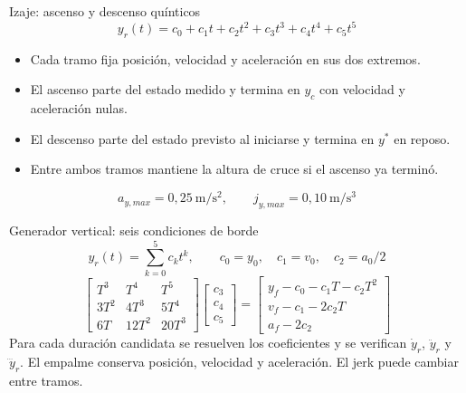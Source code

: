 \documentclass[aspectratio=169,11pt]{beamer}
\begin{document}
\begin{frame}[t,label=trayectoria3]{Izaje: ascenso y descenso quínticos}
\[ y_r(t)=c_0+c_1t+c_2t^2+c_3t^3+c_4t^4+c_5t^5 \]
\begin{itemize}
\item Cada tramo fija posición, velocidad y aceleración en sus dos extremos.
\item El ascenso parte del estado medido y termina en $y_c$ con velocidad y aceleración nulas.
\item El descenso parte del estado previsto al iniciarse y termina en $y^*$ en reposo.
\item Entre ambos tramos mantiene la altura de cruce si el ascenso ya terminó.
\end{itemize}
\[ a_{y,max}=0{,}25\ \mathrm{m/s^2},\qquad j_{y,max}=0{,}10\ \mathrm{m/s^3} \]

\end{frame}
\begin{frame}[t,label=quinticacondiciones]{Generador vertical: seis condiciones de borde}
\[
y_r(t)=\sum_{k=0}^{5}c_kt^k,\qquad c_0=y_0,\quad c_1=v_0,\quad c_2=a_0/2
\]
{\small
\[
\begin{bmatrix}T^3&T^4&T^5\\3T^2&4T^3&5T^4\\6T&12T^2&20T^3\end{bmatrix}
\begin{bmatrix}c_3\\c_4\\c_5\end{bmatrix}
=\begin{bmatrix}y_f-c_0-c_1T-c_2T^2\\v_f-c_1-2c_2T\\a_f-2c_2\end{bmatrix}
\]
}
\small Para cada duración candidata se resuelven los coeficientes y se verifican $\dot y_r$, $\ddot y_r$ y $\dddot y_r$. El empalme conserva posición, velocidad y aceleración. El jerk puede cambiar entre tramos.
\end{frame}
\end{document}
